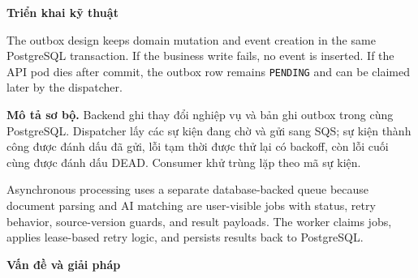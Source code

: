 \vspace{0.5em}\noindent\textbf{Triển khai kỹ
thuật}\par

The outbox design keeps domain mutation and event creation in the same
PostgreSQL transaction. If the business write fails, no event is
inserted. If the API pod dies after commit, the outbox row remains
\texttt{PENDING} and can be claimed later by the dispatcher.

\textbf{Mô tả sơ bộ.} Backend ghi thay đổi nghiệp vụ và bản ghi outbox
trong cùng PostgreSQL. Dispatcher lấy các sự kiện đang chờ và gửi sang
SQS; sự kiện thành công được đánh dấu đã gửi, lỗi tạm thời được thử lại
có backoff, còn lỗi cuối cùng được đánh dấu DEAD. Consumer khử trùng lặp
theo mã sự kiện.

Asynchronous processing uses a separate database-backed queue because
document parsing and AI matching are user-visible jobs with status,
retry behavior, source-version guards, and result payloads. The worker
claims jobs, applies lease-based retry logic, and persists results back
to PostgreSQL.

\vspace{0.5em}\noindent\textbf{Vấn đề và giải
pháp}\par

